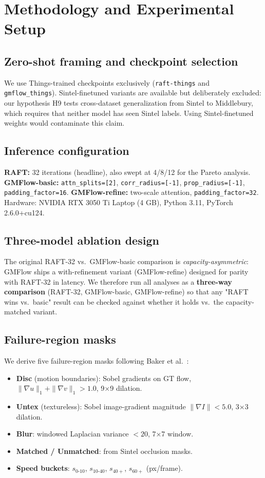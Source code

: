 \documentclass[11pt,a4paper]{article}
\let\origsection\section
\renewcommand{\section}{\FloatBarrier\origsection}
\newcommand{\refine}{GMFlow-refine}
\begin{document}
\section{Methodology and Experimental Setup}

\subsection{Zero-shot framing and checkpoint selection}
We use Things-trained checkpoints exclusively (\texttt{raft-things} and
\texttt{gmflow\_things}).  Sintel-finetuned variants are available but
deliberately excluded: our hypothesis H9 tests cross-dataset
generalization from Sintel to Middlebury, which requires that neither
model has seen Sintel labels.  Using Sintel-finetuned weights would
contaminate this claim.

\subsection{Inference configuration}
\textbf{RAFT:} 32 iterations (headline), also swept at 4/8/12 for the
Pareto analysis.  \textbf{GMFlow-basic:} \texttt{attn\_splits=[2]},
\texttt{corr\_radius=[-1]}, \texttt{prop\_radius=[-1]},
\texttt{padding\_factor=16}.  \textbf{GMFlow-refine:} two-scale
attention, \texttt{padding\_factor=32}.  Hardware: NVIDIA RTX 3050 Ti
Laptop (4 GB), Python 3.11, PyTorch 2.6.0+cu124.

\subsection{Three-model ablation design}
The original RAFT-32 vs.\ GMFlow-basic comparison is
\emph{capacity-asymmetric}: GMFlow ships a with-refinement variant
(\refine) designed for parity with RAFT-32 in latency.  We therefore
run all analyses as a \textbf{three-way comparison} (RAFT-32,
GMFlow-basic, GMFlow-refine) so that any "RAFT wins vs.\ basic" result
can be checked against whether it holds vs.\ the capacity-matched
variant.

\subsection{Failure-region masks}
We derive five failure-region masks following Baker et al.\ \cite{baker2011}:
\begin{itemize}[leftmargin=1.4em,topsep=2pt,itemsep=1pt]
  \item \textbf{Disc} (motion boundaries): Sobel gradients on GT flow,
        $\|\nabla u\|_1+\|\nabla v\|_1 > 1.0$, 9×9 dilation.
  \item \textbf{Untex} (textureless): Sobel image-gradient magnitude
        $\|\nabla I\| < 5.0$, 3×3 dilation.
  \item \textbf{Blur}: windowed Laplacian variance $< 20$, 7×7 window.
  \item \textbf{Matched / Unmatched}: from Sintel occlusion masks.
  \item \textbf{Speed buckets}: $s_{0\text{-}10}$, $s_{10\text{-}40}$, $s_{40+}$, $s_{60+}$ (px/frame).
\end{itemize}
\end{document}
